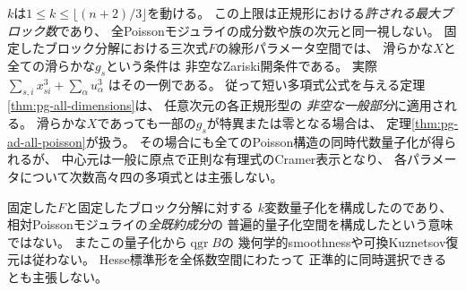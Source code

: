 \begin{remark}
\label{rem:pg-ad-scope}
$k$は$1\le k\le\lfloor(n+2)/3\rfloor$を動ける。
この上限は正規形における\emph{許される最大ブロック数}であり、
全Poissonモジュライの成分数や族の次元と同一視しない。
固定したブロック分解における三次式$F$の線形パラメータ空間では、
滑らかな$X$と全ての滑らかな$g_s$という条件は
非空なZariski開条件である。
実際$\sum_{s,i}x_{si}^3+\sum_\alpha u_\alpha^3$
はその一例である。
従って短い多項式公式を与える定理\ref{thm:pg-all-dimensions}は、
任意次元の各正規形型の
\emph{非空な一般部分}に適用される。
滑らかな$X$であっても一部の$g_s$が特異または零となる場合は、
定理\ref{thm:pg-ad-all-poisson}が扱う。
その場合にも全てのPoisson構造の同時代数量子化が得られるが、
中心元は一般に原点で正則な有理式のCramer表示となり、
各パラメータについて次数高々四の多項式とは主張しない。

固定した$F$と固定したブロック分解に対する
$k$変数量子化を構成したのであり、
相対Poissonモジュライの\emph{全既約成分}の
普遍的量子化空間を構成したという意味ではない。
またこの量子化から$\operatorname{qgr}B$の
幾何学的smoothnessや可換Kuznetsov復元は従わない。
Hesse標準形を全係数空間にわたって
正準的に同時選択できるとも主張しない。
\end{remark}

